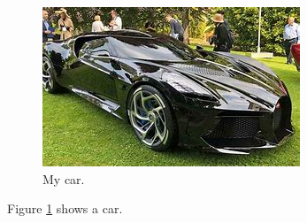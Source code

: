 \documentclass{article}
\begin{document}
	\begin{figure}
		\includegraphics[width=\linewidth]{my car.jpg}
		\caption{My car.}
		\label{fig:my car}
	\end{figure}
Figure \ref{fig:my car} shows a car.
\end{document}
